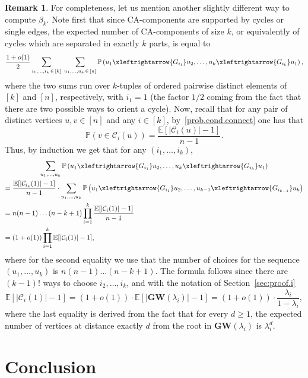 \documentclass[10pt]{amsart}
\theoremstyle{definition}\newtheorem{defi}[theo]{Definition}\newtheorem{rema}[theo]{Remark}\newtheorem{exam}[theo]{Example}\newtheorem{exem}[theo]{Example}\newtheorem{nota}[theo]{Notation}
\newcommand{\GW}{\mathbf{GW}}
\renewcommand{\Pr}{\mathbb{P}}
\newcommand{\bbE}{\mathbb{E}}
\newcommand{\cC}{\mathcal{C}}
\begin{document}
\begin{rema}
For completeness, let us mention another slightly different way to compute $\beta_k$. Note first that since CA-components are supported by cycles or single edges, the expected number of CA-components of size $k$, or equivalently of cycles which are separated in exactly $k$ parts, is equal to
\[
\frac {1+o(1)}2 \sum_{i_1,\dots,i_k\,\in\,[k]}\;\sum_{u_1, \dots, u_k\,\in\,[n]}
\Pr\left(u_1 \xleftrightarrow{G_{i_1}} u_2, \dots, u_k\xleftrightarrow{G_{i_k}} u_1\right),
\]
where the two sums run over $k$-tuples of ordered pairwise distinct elements of $[k]$ and $[n]$, respectively, with $i_1=1$ (the factor $1/2$ coming from the fact that there are two possible ways to orient a cycle). Now, recall that for any pair of distinct vertices $u,v \in [n]$ and any $i\in [k]$, by~\eqref{prob.cond.connect} one has that
\[
\Pr(v\in \cC_i(u)) = \frac{\bbE[|\cC_i(u)|-1]}{n-1}.
\]
Thus, by induction we get that for any $(i_1,\dots,i_k)$,
\begin{multline*}
\sum_{u_1,\dots,u_k} \Pr\left(u_1 \xleftrightarrow{G_{i_1}} u_2, \dots, u_k\xleftrightarrow{G_{i_k}} u_1\right)\\
\begin{aligned}
= \; &\frac{\bbE[|\cC_{i_k}(1)|-1]}{n-1}\cdot \sum_{u_1,\dots,u_k}
\Pr\left(u_1 \xleftrightarrow{G_{i_1}} u_2, \dots, u_{k-1}\xleftrightarrow{G_{i_{k-1}}} u_k\right)\\
= \; &n(n-1)\dots(n-k+1)\prod_{i=1}^k \frac{\bbE[|\cC_i(1)|-1]}{n-1}\\
= \; &(1+o(1)) \prod_{i=1}^k \bbE[|\cC_i(1)|-1],
\end{aligned}
\end{multline*}
where for the second equality we use that the number of choices for the sequence $(u_1,\dots,u_k)$ is $n(n-1)\dots(n-k+1)$. The formula follows since there are $(k-1)!$ ways to choose $i_2,\dots,i_k$, and with the notation of Section~\ref{sec:proof.i}
\[
\bbE[|\cC_i(1)|-1] = (1+o(1))\cdot \bbE[|\GW(\lambda_i)|-1] = (1+o(1))\cdot \frac{\lambda_i}{1-\lambda_i},
\]
where the last equality is derived from the fact that for every $d\ge 1$, the expected number of vertices at distance exactly $d$ from the root in $\GW(\lambda_i)$ is $\lambda_i^d$.
\end{rema}

\section{Conclusion}\label{sec:discussion}
\end{document}
